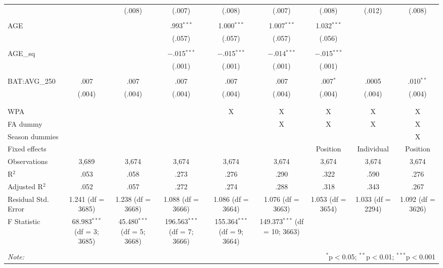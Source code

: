 \begin{table}[H]
\begin{tabular}{@{\extracolsep{5pt}}lcccccccc}
  &  & (.008) & (.007) & (.008) & (.007) & (.008) & (.012) & (.008) \\ 
  & & & & & & & & \\ 
 AGE &  &  & .993$^{***}$ & 1.000$^{***}$ & 1.007$^{***}$ & 1.032$^{***}$ &  &  \\ 
  &  &  & (.057) & (.057) & (.057) & (.056) &  &  \\ 
  & & & & & & & & \\ 
 AGE\_sq &  &  & $-$.015$^{***}$ & $-$.015$^{***}$ & $-$.014$^{***}$ & $-$.015$^{***}$ &  &  \\ 
  &  &  & (.001) & (.001) & (.001) & (.001) &  &  \\ 
  & & & & & & & & \\ 
 BAT:AVG\_250 & .007 & .007 & .007 & .007 & .007 & .007$^{*}$ & .0005 & .010$^{**}$ \\ 
  & (.004) & (.004) & (.004) & (.004) & (.004) & (.004) & (.004) & (.004) \\ 
  & & & & & & & & \\ 
\hline \\[-1.8ex] 
WPA &  &  &  & X & X & X & X & X \\ 
FA dummy &  &  &  &  & X & X & X & X \\ 
Season dummies &  &  &  &  &  &  &  & X \\ 
Fixed effects &  &  &  &  &  & Position & Individual & Position \\ 
Observations & 3,689 & 3,674 & 3,674 & 3,674 & 3,674 & 3,674 & 3,674 & 3,674 \\ 
R$^{2}$ & .053 & .058 & .273 & .276 & .290 & .322 & .590 & .276 \\ 
Adjusted R$^{2}$ & .052 & .057 & .272 & .274 & .288 & .318 & .343 & .267 \\ 
Residual Std. Error & 1.241 (df = 3685) & 1.238 (df = 3668) & 1.088 (df = 3666) & 1.086 (df = 3664) & 1.076 (df = 3663) & 1.053 (df = 3654) & 1.033 (df = 2294) & 1.092 (df = 3626) \\ 
F Statistic & 68.983$^{***}$ (df = 3; 3685) & 45.480$^{***}$ (df = 5; 3668) & 196.563$^{***}$ (df = 7; 3666) & 155.364$^{***}$ (df = 9; 3664) & 149.373$^{***}$ (df = 10; 3663) &  &  &  \\ 
\hline 
\hline \\[-1.8ex] 
\textit{Note:}  & \multicolumn{8}{r}{$^{*}$p$<$0.05; $^{**}$p$<$0.01; $^{***}$p$<$0.001} \\ 
\end{tabular} 
\end{table} 
